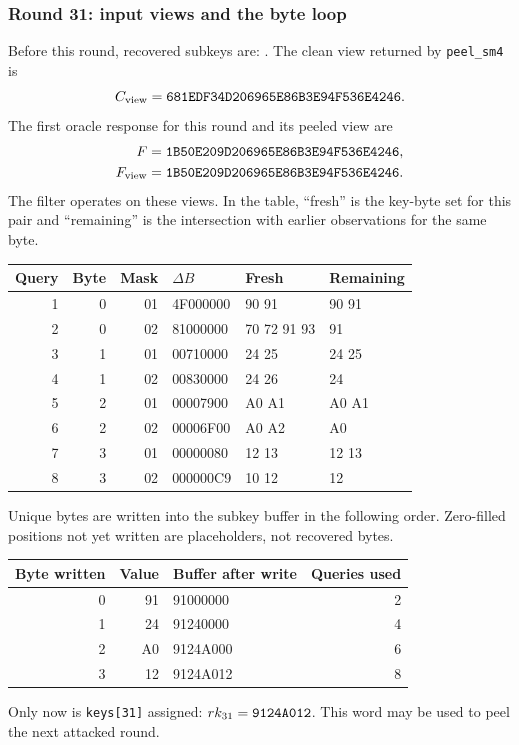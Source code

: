 \subsubsection*{Round 31: input views and the byte loop}
Before this round, recovered subkeys are:
.
The clean view returned by \texttt{peel\_sm4} is
\[C_{\rm view}=\texttt{681EDF34D206965E86B3E94F536E4246}.\]
The first oracle response for this round and its peeled view are
\[\begin{aligned}F&=\texttt{1B50E209D206965E86B3E94F536E4246},\\F_{\rm view}&=\texttt{1B50E209D206965E86B3E94F536E4246}.\end{aligned}\]
The filter operates on these views. In the table, ``fresh'' is the key-byte set for this pair and ``remaining'' is the intersection with earlier observations for the same byte.
\begin{center}\small\begin{tabular}{rrrlll}\toprule
Query & Byte & Mask & $\Delta B$ & Fresh & Remaining\\\midrule
1 & 0 & 01 & 4F000000 & 90 91 & 90 91\\
2 & 0 & 02 & 81000000 & 70 72 91 93 & 91\\
3 & 1 & 01 & 00710000 & 24 25 & 24 25\\
4 & 1 & 02 & 00830000 & 24 26 & 24\\
5 & 2 & 01 & 00007900 & A0 A1 & A0 A1\\
6 & 2 & 02 & 00006F00 & A0 A2 & A0\\
7 & 3 & 01 & 00000080 & 12 13 & 12 13\\
8 & 3 & 02 & 000000C9 & 10 12 & 12\\
\bottomrule\end{tabular}\end{center}
Unique bytes are written into the subkey buffer in the following order. Zero-filled positions not yet written are placeholders, not recovered bytes.
\begin{center}\small\begin{tabular}{rrlr}\toprule
Byte written & Value & Buffer after write & Queries used\\\midrule
0 & 91 & 91000000 & 2\\
1 & 24 & 91240000 & 4\\
2 & A0 & 9124A000 & 6\\
3 & 12 & 9124A012 & 8\\
\bottomrule\end{tabular}\end{center}
Only now is \texttt{keys[31]} assigned: $rk_{31}=\texttt{9124A012}$. This word may be used to peel the next attacked round.

